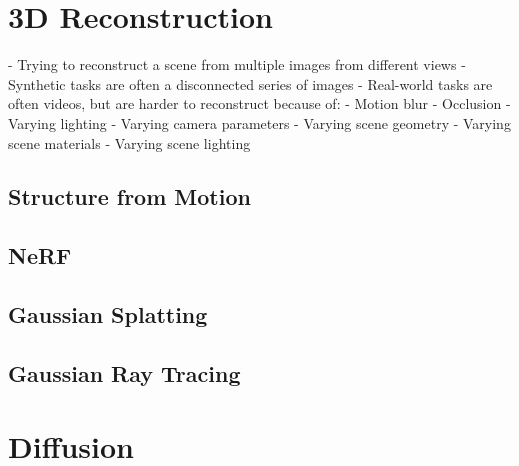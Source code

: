\section{3D Reconstruction}

- Trying to reconstruct a scene from multiple images from different views
- Synthetic tasks are often a disconnected series of images
- Real-world tasks are often videos, but are harder to reconstruct because of:
    - Motion blur
    - Occlusion
    - Varying lighting
    - Varying camera parameters
    - Varying scene geometry
    - Varying scene materials
    - Varying scene lighting


\subsection{Structure from Motion}

\subsection{NeRF}

\subsection{Gaussian Splatting}

\subsection{Gaussian Ray Tracing}

\section{Diffusion}